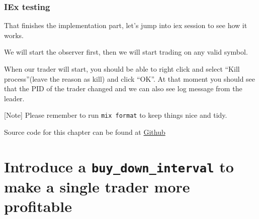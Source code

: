 \documentclass[
  oneside]{book}
\newenvironment{Shaded}{\begin{snugshade}}{\end{snugshade}}
\newcommand{\AttributeTok}[1]{\textcolor[rgb]{0.77,0.63,0.00}{#1}}
\newcommand{\CommentTok}[1]{\textcolor[rgb]{0.56,0.35,0.01}{\textit{#1}}}
\newcommand{\ErrorTok}[1]{\textcolor[rgb]{0.64,0.00,0.00}{\textbf{#1}}}
\newcommand{\ExtensionTok}[1]{#1}
\newcommand{\KeywordTok}[1]{\textcolor[rgb]{0.13,0.29,0.53}{\textbf{#1}}}
\newcommand{\NormalTok}[1]{#1}
\newcommand{\OperatorTok}[1]{\textcolor[rgb]{0.81,0.36,0.00}{\textbf{#1}}}
\newcommand{\StringTok}[1]{\textcolor[rgb]{0.31,0.60,0.02}{#1}}
\begin{document}
\hypertarget{iex-testing}{%
\subsection{IEx testing}\label{iex-testing}}

That finishes the implementation part, let's jump into iex session to see how it works.

We will start the observer first, then we will start trading on any valid symbol.

When our trader will start, you should be able to right click and select ``Kill process''(leave the reason as kill) and click ``OK''. At that moment you should see that the PID of the trader changed and we can also see log message from the leader.

\begin{Shaded}
\end{Shaded}

{[}Note{]} Please remember to run \texttt{mix\ format} to keep things nice and tidy.

Source code for this chapter can be found at \href{https://github.com/frathon/create-a-cryptocurrency-trading-bot-in-elixir-source-code/tree/chapter_05}{Github}

\hypertarget{introduce-a-buy_down_interval-to-make-a-single-trader-more-profitable}{%
\chapter{\texorpdfstring{Introduce a \texttt{buy\_down\_interval} to make a single trader more profitable}{Introduce a buy\_down\_interval to make a single trader more profitable}}\label{introduce-a-buy_down_interval-to-make-a-single-trader-more-profitable}}
\end{document}
